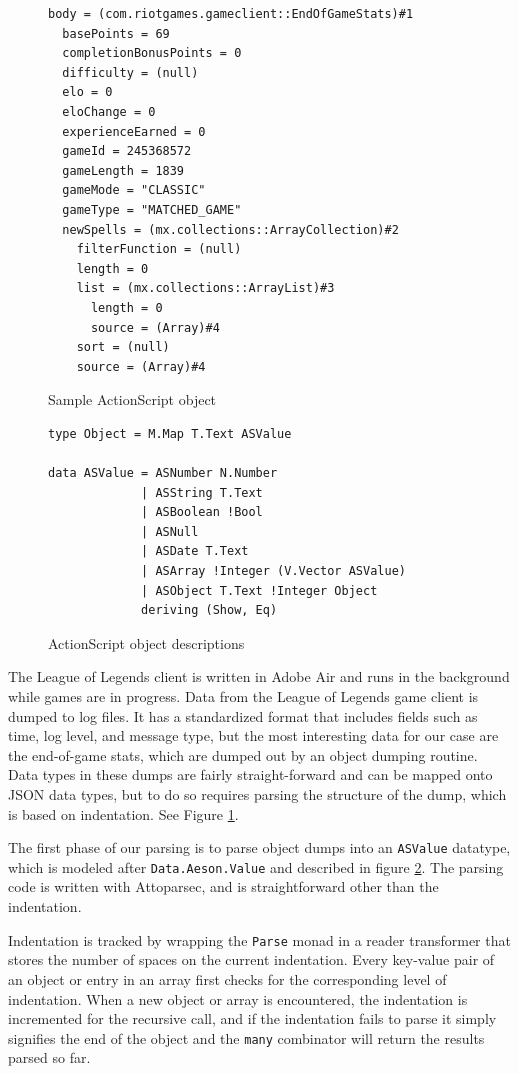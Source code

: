 \documentclass[letterpaper,twocolumn,9pt]{article}
\newcommand{\code}[1]{\texttt{#1}}
\begin{document}
\begin{figure}[btp]
\footnotesize{
\begin{verbatim}
body = (com.riotgames.gameclient::EndOfGameStats)#1
  basePoints = 69
  completionBonusPoints = 0
  difficulty = (null)
  elo = 0
  eloChange = 0
  experienceEarned = 0
  gameId = 245368572
  gameLength = 1839
  gameMode = "CLASSIC"
  gameType = "MATCHED_GAME"
  newSpells = (mx.collections::ArrayCollection)#2
    filterFunction = (null)
    length = 0
    list = (mx.collections::ArrayList)#3
      length = 0
      source = (Array)#4
    sort = (null)
    source = (Array)#4
\end{verbatim}
}
    \caption{Sample ActionScript object}
    \label{samplelog}
\end{figure}

\begin{figure}[h]
\footnotesize{
\begin{verbatim}
type Object = M.Map T.Text ASValue

data ASValue = ASNumber N.Number
             | ASString T.Text
             | ASBoolean !Bool
             | ASNull
             | ASDate T.Text
             | ASArray !Integer (V.Vector ASValue)
             | ASObject T.Text !Integer Object
             deriving (Show, Eq)
\end{verbatim}
}
    \caption{ActionScript object descriptions}
    \label{asvalue}
\end{figure}

The League of Legends client is written in Adobe Air and runs in the background while games are in progress. Data from the League of Legends game client is dumped to log files.  It has a standardized format that includes fields such as time, log level, and message type, but the most interesting data for our case are the end-of-game stats, which are dumped out by an object dumping routine.  Data types in these dumps are fairly straight-forward and can be mapped onto JSON data types, but to do so requires parsing the structure of the dump, which is based on indentation.  See Figure \ref{samplelog}.

The first phase of our parsing is to parse object dumps into an \code{ASValue} datatype, which is modeled after \code{Data.Aeson.Value} and described in figure \ref{asvalue}.  The parsing code is written with Attoparsec, and is straightforward other than the indentation.

Indentation is tracked by wrapping the \code{Parse} monad in a reader transformer that stores the number of spaces on the current indentation.  Every key-value pair of an object or entry in an array first checks for the corresponding level of indentation.  When a new object or array is encountered, the indentation is incremented for the recursive call, and if the indentation fails to parse it simply signifies the end of the object and the \code{many} combinator will return the results parsed so far.
\end{document}
